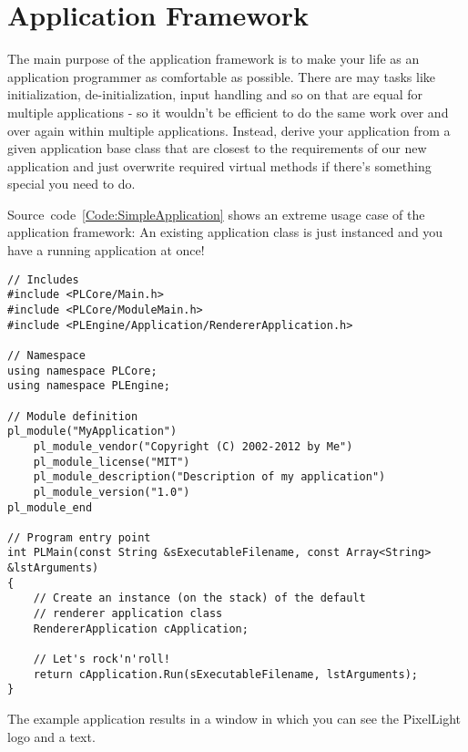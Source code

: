 \section{Application Framework}
The main purpose of the application framework is to make your life as an application programmer as comfortable as possible. There are may tasks like initialization, de-initialization, input handling and so on that are equal for multiple applications - so it wouldn't be efficient to do the same work over and over again within multiple applications. Instead, derive your application from a given application base class that are closest to the requirements of our new application and just overwrite required virtual methods if there's something special you need to do.

Source~code~\ref{Code:SimpleApplication} shows an extreme usage case of the application framework: An existing application class is just instanced and you have a running application at once!
\begin{lstlisting}[label=Code:SimpleApplication,caption={Simple application using the application framework}]
// Includes
#include <PLCore/Main.h>
#include <PLCore/ModuleMain.h>
#include <PLEngine/Application/RendererApplication.h>

// Namespace
using namespace PLCore;
using namespace PLEngine;

// Module definition
pl_module("MyApplication")
	pl_module_vendor("Copyright (C) 2002-2012 by Me")
	pl_module_license("MIT")
	pl_module_description("Description of my application")
	pl_module_version("1.0")
pl_module_end

// Program entry point
int PLMain(const String &sExecutableFilename, const Array<String> &lstArguments)
{
	// Create an instance (on the stack) of the default
	// renderer application class
	RendererApplication cApplication;

	// Let's rock'n'roll!
	return cApplication.Run(sExecutableFilename, lstArguments);
}
\end{lstlisting}
The example application results in a window in which you can see the PixelLight logo and a text.
